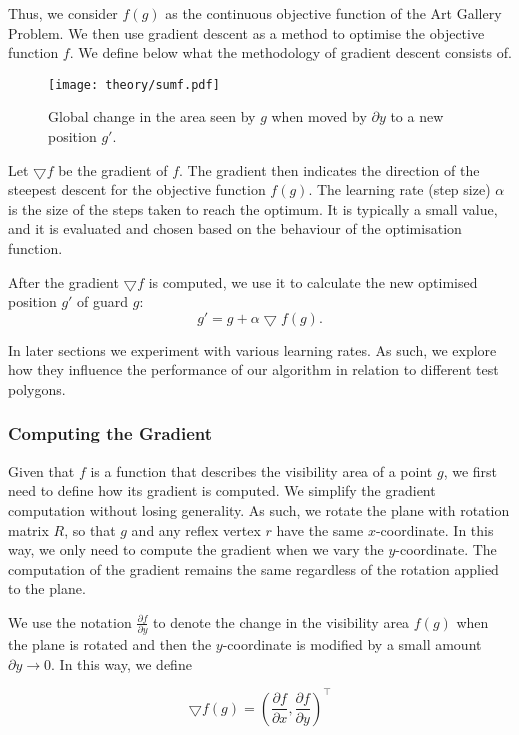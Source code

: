 Thus, we consider $f(g)$ as the continuous objective function of the Art Gallery Problem. We  then use gradient descent as a method to optimise the objective function $f$. We define below what the methodology of gradient descent consists of.

\begin{figure}[h!]
    \centering
    \texttt{[image: theory/sumf.pdf]}
    \caption{Global change in the area seen by $g$ when moved by $\partial y$ to a new position $g'$.}
    \label{fig:sumf}
\end{figure}


Let $\bigtriangledown f$ be the gradient of $f$. The gradient then indicates the direction of the steepest descent for the objective function $f(g)$.
The learning rate (step size) $\alpha$ is the size of the steps taken to reach the optimum. It is typically a small value, and it is evaluated and chosen based on the behaviour of the optimisation function. 

After the gradient $\bigtriangledown f$ is computed, we  use it to calculate the new optimised position $g'$ of guard $g$: $$g' = g + \alpha\bigtriangledown f(g).$$


In later sections we experiment with various learning rates. As such, we  explore how they influence the performance of our algorithm in relation to different test polygons. 

\subsubsection{Computing the Gradient}

Given that $f$ is a function that describes the visibility area of a point $g$, we first need to define how its gradient is computed. We  simplify the gradient computation without losing generality. As such, we  rotate the plane with rotation matrix $R$, so that $g$ and any reflex vertex $r$ have the same $x$-coordinate. In this way, we only need to compute the gradient when we vary the $y$-coordinate. The computation of the gradient remains the same regardless of the rotation applied to the plane.


We  use the notation $\frac{\partial f}{\partial y}$ to denote the change in the visibility area $f(g)$ when the plane is rotated and then the $y$-coordinate is modified by a small amount $\partial y \rightarrow 0$. In this way, we define 

\begin{equation}
    \bigtriangledown f(g) = \left(\frac{\partial f}{\partial x}, \frac{\partial f}{\partial y}\right)^\intercal \label{eq:gradient}
\end{equation}

